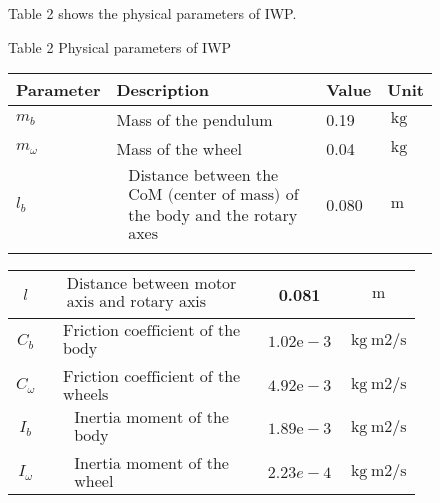 \documentclass[10pt]{article}
\begin{document}
Table 2 shows the physical parameters of IWP.

Table 2 Physical parameters of IWP

\begin{center}
\begin{tabular}{llll}
\hline
Parameter & Description & Value & Unit \\
\hline
$m_{b}$ & Mass of the pendulum & 0.19 & $\mathrm{~kg}$ \\
$m_{\omega}$ & Mass of the wheel & 0.04 & $\mathrm{~kg}$ \\
$l_{b}$ & $\begin{array}{l}\text { Distance between the } \\ \text { CoM (center of mass) of } \\ \text { the body and the rotary } \\ \text { axes }\end{array}$ & 0.080 & $\mathrm{~m}$ \\
 &  &  &  \\
\hline
\end{tabular}
\end{center}

\begin{center}
\begin{tabular}{|c|c|c|c|}
\hline
$l$ & $\begin{array}{l}\text { Distance between motor } \\ \text { axis and rotary axis }\end{array}$ & 0.081 & $\mathrm{~m}$ \\
\hline
$C_{b}$ & $\begin{array}{l}\text { Friction coefficient of the } \\ \text { body }\end{array}$ & $1.02 \mathrm{e}-3$ & $\mathrm{~kg} \mathrm{~m} 2 / \mathrm{s}$ \\
\hline
$C_{\omega}$ & $\begin{array}{l}\text { Friction coefficient of the } \\ \text { wheels }\end{array}$ & $4.92 \mathrm{e}-3$ & $\mathrm{~kg} \mathrm{~m} 2 / \mathrm{s}$ \\
\hline
$I_{b}$ & $\begin{array}{l}\text { Inertia moment of the } \\ \text { body }\end{array}$ & $1.89 \mathrm{e}-3$ & $\mathrm{~kg} \mathrm{~m} 2 / \mathrm{s}$ \\
\hline
$I_{\omega}$ & $\begin{array}{l}\text { Inertia moment of the } \\ \text { wheel }\end{array}$ & $2.23 e-4$ & $\mathrm{~kg} \mathrm{~m} 2 / \mathrm{s}$ \\
\hline
\end{tabular}
\end{center}
\end{document}
